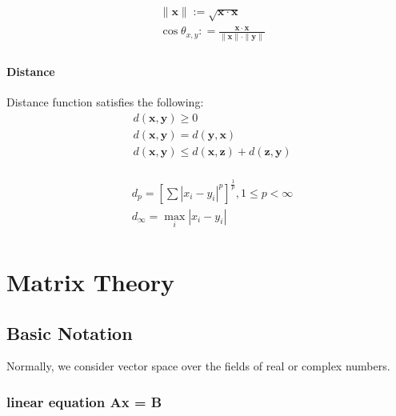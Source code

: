 \documentclass[UTF8]{../../09-Mathematics}
\begin{document}
\begin{equation}
    \begin{split}
    &\parallel \boldsymbol{x} \parallel := \sqrt{\boldsymbol x \cdot \boldsymbol x}\\
    &\cos {\theta_{x,y}} : = \frac
    {\boldsymbol x \cdot \boldsymbol x}
    {\parallel \boldsymbol{x} \parallel \cdot \parallel \boldsymbol{y} \parallel}\\
\end{split}
\end{equation}


\subsubsection{Distance}

Distance function satisfies the following:
\begin{equation}\label{Defination:Distance_function}
    \begin{split}
    &d(\boldsymbol x, \boldsymbol y) \geqslant 0\\
    &d(\boldsymbol x, \boldsymbol y) = d(\boldsymbol y, \boldsymbol x)\\
    &d(\boldsymbol x, \boldsymbol y) \leqslant d(\boldsymbol x, \boldsymbol z) + d(\boldsymbol z, \boldsymbol y)\\
\end{split}
\end{equation}

\begin{equation}
    \begin{split}
    &d_p = [\sum |x_i-y_i|^p]^{\frac{1}{p}}, 1\leqslant p < \infty\\
    & d_{\infty} = \max_i|x_i-y_i|\\
\end{split}
\end{equation}



\chapter{Matrix Theory}


\section{Basic Notation}

Normally, we consider vector space over the fields of real or complex numbers.

\subsection{linear equation Ax = B}
\end{document}
